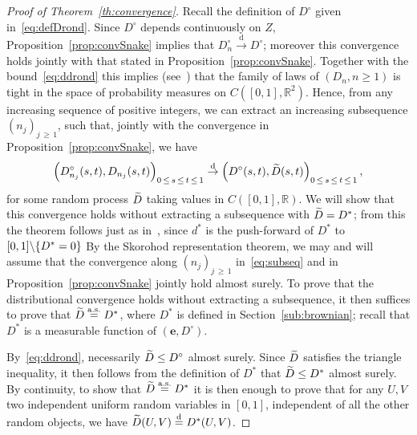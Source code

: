 \documentclass[AHL,Unicode,longabstracts,published]{cedram}
\providecommand{\R}{}
\renewcommand{\R}{\mathbb{R}}
\newcommand{\bfe}{\mathbf{e}}
\newcommand{\eqdist}{\ensuremath{\stackrel{\mathrm{d}}{=}}}
\newcommand{\convdist}{\ensuremath{\stackrel{\mathrm{d}}{\rightarrow}}}
\newcommand{\aseq}{\ensuremath{\stackrel{\mathrm{a.s.}}{=}}}
\let\oldtilde\tilde
\renewcommand*{\tilde}[1]{\mathchoice{\widetilde{#1}}{\widetilde{#1}}{\oldtilde{#1}}{\oldtilde{#1}}}
\newcommand{\R}{\mathbb{R}}
\begin{document}
\begin{proof}[{Proof of Theorem~\ref{th:convergence}}]
Recall the definition of $D^\circ$ given in~\eqref{eq:defDrond}. Since $D^\circ$ depends continuously on $Z$, Proposition~\ref{prop:convSnake} implies that $D_n^\circ \convdist D^\circ$; moreover this convergence holds jointly with that stated in Proposition~\ref{prop:convSnake}. Together with the bound~\eqref{eq:ddrond} this implies (see~\cite[Proposition~3.2]{LeGallInventiones}) that the family of laws of $(D_n,n \ge 1)$ is tight in the space of probability measures on $C([0,1],\R^2)$. Hence, from any increasing sequence of positive integers, we can extract an increasing subsequence $(n_j)_{j\,\geq\,1}$, such that, jointly with the convergence in Proposition~\ref{prop:convSnake}, we have
\begin{equation}\label{eq:subseq}
\left(D^\circ_{n_j}(s,t),D_{n_j}(s,t)\right)_{0\,\leq\,s\,\leq\,t\,\leq\,1}\convdist \left(D^\circ(s,t),\tilde D(s,t)\right)_{0\,\leq\,s\,\leq\,t\,\leq\,1},
\end{equation}
for some random process $\tilde{D}$ taking values in $C([0,1],\R)$. We will show that this convergence holds without extracting a subsequence with $\tilde D=D^*$; from this the theorem follows just as in~\cite{LeGallUniqueness}, since $d^*$ is the push-forward of $D^*$ to $[0,1]\backslash \{D^*\linebreak=0\}$ By the Skorohod representation theorem, we may and will assume that the convergence along $(n_j)_{j\,\geq\,1}$ in~\eqref{eq:subseq} and in Proposition~\ref{prop:convSnake} jointly hold almost surely. To prove that the distributional convergence holds without extracting a subsequence, it then suffices to prove that $\tilde D\aseq D^*$, where $D^*$ is defined in Section~\ref{sub:brownian}; recall that $D^*$ is a measurable function of $(\bfe,D^\circ)$.


By~\eqref{eq:ddrond}, necessarily $\tilde D\leq D^\circ$ almost surely. Since $\tilde D$ satisfies the triangle inequality, it then follows from the definition of $D^*$ that $\tilde D\leq D^*$ almost surely. By continuity, to show that $\tilde D\aseq D^*$ it is then enough to prove that for any $U,V$ two independent uniform random variables in $[0,1]$, independent of all the other random objects, we have $\tilde D(U,V)\eqdist D^*(U,V)$.


\end{proof}
\end{document}
